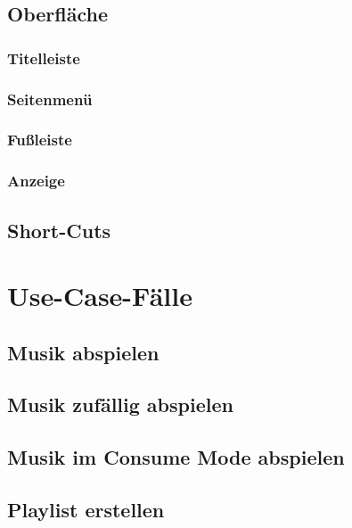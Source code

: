 \subsection{Oberfläche}
\subsubsection{Titelleiste}
\subsubsection{Seitenmenü}
\subsubsection{Fußleiste}
\subsubsection{Anzeige}
\subsection{Short-Cuts}
\section{Use-Case-Fälle}
\subsection{Musik abspielen}
\subsection{Musik zufällig abspielen}
\subsection{Musik im Consume Mode abspielen}
\subsection{Playlist erstellen}

